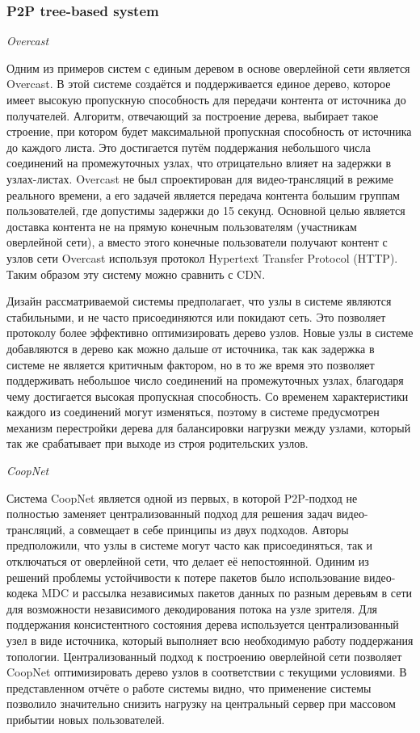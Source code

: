 		\subsubsection{P2P tree-based system}

		\textit{Overcast}

		Одним из примеров систем с единым деревом в основе оверлейной сети является Overcast. В этой системе
		создаётся и поддерживается единое дерево, которое имеет высокую пропускную способность для передачи контента от
		источника до получателей. Алгоритм, отвечающий за построение дерева, выбирает такое строение, при котором будет
		максимальной пропускная способность от источника до каждого листа. Это достигается путём поддержания небольшого
		числа соединений на промежуточных узлах, что отрицательно влияет на задержки в узлах-листах. Overcast не был
		спроектирован для видео-трансляций в режиме реального времени, а его задачей является передача контента большим
		группам пользователей, где допустимы задержки до 15 секунд. Основной целью является доставка контента не на
		прямую конечным пользователям (участникам оверлейной сети), а вместо этого конечные пользователи получают
		контент с узлов сети Overcast используя протокол Hypertext Transfer Protocol (HTTP). Таким образом эту
		систему можно сравнить с CDN.

		Дизайн рассматриваемой системы предполагает, что узлы в системе являются стабильными, и не часто присоединяются
		или покидают сеть. Это позволяет протоколу более эффективно оптимизировать дерево узлов. Новые узлы в системе
		добавляются в дерево как можно дальше от источника, так как задержка в системе не является критичным фактором,
		но в то же время это позволяет поддерживать небольшое число соединений на промежуточных узлах, благодаря чему
		достигается высокая пропускная способность. Со временем характеристики каждого из соединений могут изменяться,
		поэтому в системе предусмотрен механизм перестройки дерева для балансировки нагрузки между узлами, который так
		же срабатывает при выходе из строя родительских узлов.

		\textit{CoopNet}

		Система CoopNet является одной из первых, в которой P2P-подход не полностью заменяет централизованный подход
		для решения задач видео-трансляций, а совмещает в себе принципы из двух подходов. Авторы предположили, что
		узлы в системе могут часто как присоединяться, так и отключаться от оверлейной сети, что делает её непостоянной.
		Одиним из решений проблемы устойчивости к потере пакетов было использование видео-кодека MDC и рассылка
		независимых пакетов данных по разным деревьям в сети для возможности независимого декодирования потока на
		узле зрителя. Для поддержания консистентного состояния дерева используется централизованный узел в виде
		источника, который выполняет всю необходимую работу поддержания топологии. Централизованный подход к построению
		оверлейной сети позволяет CoopNet оптимизировать дерево узлов в соответствии с текущими условиями.
		В представленном отчёте о работе системы видно, что применение системы позволило значительно снизить нагрузку
		на центральный сервер при массовом прибытии новых пользователей.

